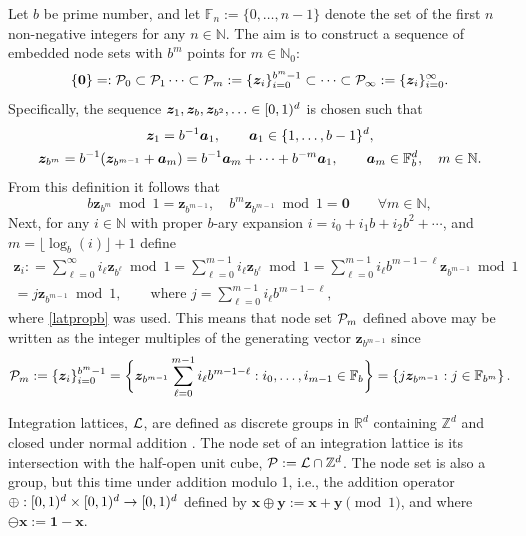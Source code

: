 \documentclass[graybox]{svmult}
\newcommand{\Z}{\mathbb{Z}} %
\newcommand{\R}{\mathbb{R}} %
\newcommand{\N}{\mathbb{N}} %
\newcommand{\F}{\mathbb{F}} %
\newcommand{\bszero}{\boldsymbol{0}} %
\newcommand{\bsone}{\boldsymbol{1}}  %
\newcommand{\bsx}{\boldsymbol{x}}    %
\newcommand{\bsy}{\boldsymbol{y}}    %
\newcommand{\bsz}{\boldsymbol{z}}    %
\begin{document}
Let $b$ be prime number, and let $\F_{n}:=\{0, \ldots, n-1\}$ denote the set of the first $n$ non-negative integers for any $n \in \N$. The aim is to construct a sequence of embedded node sets with $b^m$ points for $m \in \N_0$:
\[
\{\bszero\}=:\cp_0\subset \cp_1 \dots\subset\cp_m:=\{\bsz_i\}_{i=0}^{b^m-1} \subset\dots\subset\cp_\infty:=\{\bsz_i\}_{i=0}^{\infty}.
\]
Specifically, the sequence $\bsz_1, \bsz_b, \bsz_{b^2},  \ldots \in \cube$ is chosen such that 
\begin{subequations} \label{zbmdef}
\begin{gather} 
\bsz_1 = b^{-1} \bsa_1, \qquad \bsa_1 \in \{1, \ldots, b-1\}^{d}, \\
\bsz_{b^m} = b^{-1}(\bsz_{b^{m-1}}+\bsa_m)= b^{-1}\bsa_m + \cdots + b^{-m} \bsa_1, \qquad \bsa_m \in \F_b^{d}, \quad m \in \N.
\end{gather}
\end{subequations}
From this definition it follows that
\begin{equation} 
b\bsz_{b^m} \bmod {1} =\bsz_{b^{m-1}}, \quad b^{m}\bsz_{b^{m-1}} \bmod {1} = \bszero \qquad \forall m \in \N ,\label{latpropb}
\end{equation}
Next, for any $i \in \N$ with proper $b$-ary expansion $i=i_0+i_1 b + i_2 b^2 + \cdots$, and $m=\lfloor \log_b(i) \rfloor+1$ define 
\begin{multline} \label{zidef}
\bsz_i : = \sum_{\ell=0}^{\infty} i_\ell \bsz_{b^\ell} \bmod 1 = \sum_{\ell=0}^{m-1} i_\ell \bsz_{b^\ell} \bmod 1 = \sum_{\ell=0}^{m-1} i_\ell b^{m-1-\ell}  \bsz_{b^{m-1}} \bmod 1 \\ 
 = j \bsz_{b^{m-1}} \bmod 1, \qquad \text{where } j= \sum_{\ell=0}^{m-1} i_\ell b^{m-1-\ell},
\end{multline}
where \eqref{latpropb} was used.  This means that node set $\mathcal{P}_m$ defined above may be written as the integer multiples of the generating vector $\bsz_{b^{m-1}}$ since 
\[
\cp_m:= \{\bsz_i\}_{i=0}^{b^m-1} = \bigg \{ \bsz_{b^{m-1}} \sum_{\ell=0}^{m-1} i_\ell b^{m-1-\ell} : i_0, \ldots , i_{m-1} \in \F_b \bigg \} = \left\{ j \bsz_{b^{m-1}} : j \in \F_{b^m} \right \}.
\]

Integration lattices, $\mathcal{L}$, are defined as discrete groups in $\R^d$ containing $\Z^d$ and closed under normal addition \cite[Sec. 2.7-2.8]{SloJoe94}.  The node set of an integration lattice is its intersection with the half-open unit cube, $\cp:=\lattice \cap \Z^d$.  The node set is also a group, but this time under addition modulo 1, i.e., the addition operator $\oplus:[0,1)^d \times [0,1)^d \to [0,1)^d$ defined by $\bsx\oplus\bsy:=\bsx+\bsy\pmod 1$, and where $\ominus \bsx:=\bsone-\bsx$.
\end{document}

